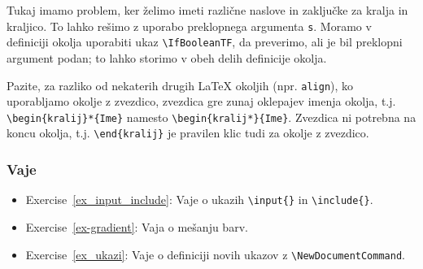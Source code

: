 \begin{example}\label{eg_okolja_kralj-2}\end{example}Tukaj imamo problem, ker želimo imeti različne naslove in zaključke za kralja in kraljico. To lahko rešimo z uporabo preklopnega argumenta \texttt{s}.
Moramo v definiciji okolja uporabiti ukaz \texttt{{\textbackslash}IfBooleanTF}, da preverimo, ali je bil preklopni argument podan; to lahko storimo v obeh delih definicije okolja.

Pazite, za razliko od nekaterih drugih LaTeX okoljih (npr. \texttt{align}), ko uporabljamo okolje z zvezdico, zvezdica gre zunaj oklepajev imenja okolja, t.j. \texttt{{\textbackslash}begin\{kralij\}*\{Ime\}} namesto \texttt{{\textbackslash}begin\{kralij*\}\{Ime\}}. Zvezdica ni potrebna na koncu okolja, t.j. \texttt{{\textbackslash}end\{kralij\}} je pravilen klic tudi za okolje z zvezdico.

\begin{example}\label{eg_kralji}\end{example}\subsubsection{Vaje}\label{05_latexRazno_vaje}

\begin{itemize}
\item Exercise~\ref{ex_input_include}: Vaje o ukazih \texttt{{\textbackslash}input\{\}} in \texttt{{\textbackslash}include\{\}}.
\item Exercise~\ref{ex-gradient}: Vaja o mešanju barv.
\item Exercise~\ref{ex_ukazi}: Vaje o definiciji novih ukazov z \texttt{{\textbackslash}NewDocumentCommand}.
\end{itemize}